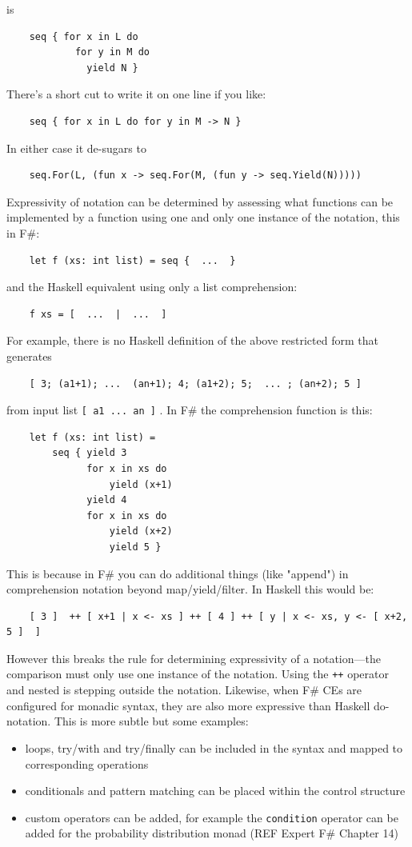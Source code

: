 \documentclass[acmsmall]{acmart}\settopmatter{}
\begin{document}
is
\begin{verbatim}
    seq { for x in L do 
            for y in M do 
              yield N }
\end{verbatim}
There’s a short cut to write it on one line if you like:
\begin{verbatim}
    seq { for x in L do for y in M -> N }
\end{verbatim}
In either case it de-sugars to
\begin{verbatim}
    seq.For(L, (fun x -> seq.For(M, (fun y -> seq.Yield(N)))))
\end{verbatim}
Expressivity of notation can be determined by assessing what functions can be implemented by a function using one and only
one instance of the notation, this in F\#:
\begin{verbatim}
    let f (xs: int list) = seq {  ...  }
\end{verbatim}
and the Haskell equivalent using only a list comprehension:
\begin{verbatim}
    f xs = [  ...  |  ...  ]
\end{verbatim}
For example, there is no Haskell definition of the above restricted form that generates
\begin{verbatim}
    [ 3; (a1+1); ...  (an+1); 4; (a1+2); 5;  ... ; (an+2); 5 ]
\end{verbatim}
from input list \texttt{[ a1 ... an ]} . In F\# the comprehension function is this:
\begin{verbatim}
    let f (xs: int list) =
        seq { yield 3
              for x in xs do 
                  yield (x+1)
              yield 4 
              for x in xs do
                  yield (x+2)
                  yield 5 }
\end{verbatim}
This is because in F\# you can do additional things (like "append") in comprehension notation beyond map/yield/filter.
In Haskell this would be:
\begin{verbatim}
    [ 3 ]  ++ [ x+1 | x <- xs ] ++ [ 4 ] ++ [ y | x <- xs, y <- [ x+2, 5 ]  ]
\end{verbatim}
However this breaks the rule for determining expressivity of a notation---the comparison must only use one instance of the notation.
Using the \texttt{++} operator and nested is stepping outside the notation.
Likewise, when F\# CEs are configured for monadic syntax, they are also more expressive than Haskell do-notation.   This is more subtle but some examples:
\begin{itemize}
\item loops, try/with and try/finally can be included in the syntax and mapped to corresponding operations

\item conditionals and pattern matching can be placed within the control structure

\item custom operators can be added, for example the \texttt{condition} operator can be added for the probability distribution monad (REF Expert F\# Chapter 14)
\end{itemize}
\end{document}
